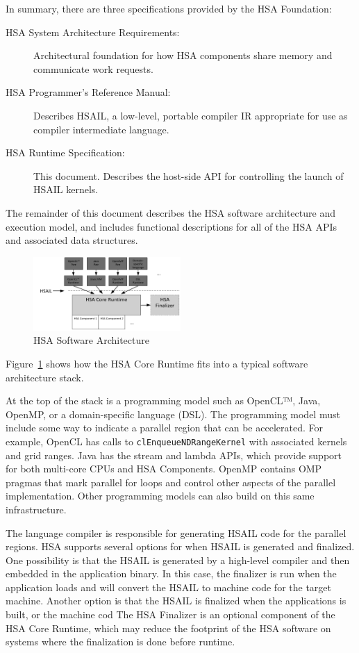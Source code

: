 \documentclass{book}
\begin{document}
In summary, there are three specifications provided by the HSA
Foundation:
\begin{description}
\item[HSA System Architecture Requirements:] Architectural foundation for
how HSA components share memory and communicate work requests.
\item[HSA Programmer’s Reference Manual:] Describes HSAIL, a low-level,
portable compiler IR appropriate for use as compiler intermediate
language.
\item[HSA Runtime Specification:] This document.  Describes the host-side
API for controlling the launch of HSAIL kernels.
\end{description}

The remainder of this document describes the HSA software
architecture and execution model, and includes functional
descriptions for all of the HSA APIs and associated data structures.

\begin{figure}
  \centering
  \includegraphics[width=0.5\textwidth]{fig/swarch}
  \centering
  \caption{HSA Software Architecture}
  \label{fig:swarch}
\end{figure}

Figure~\ref{fig:swarch} shows how the HSA Core Runtime fits into a
typical software architecture stack.

At the top of the stack is a programming model such as OpenCL™,
Java, OpenMP, or a domain-specific language (DSL).   The programming
model must include some way to indicate a parallel region that can
be accelerated.  For example, OpenCL has calls to
\texttt{clEnqueueNDRangeKernel} with associated kernels and grid ranges.
Java has the stream and lambda APIs, which provide support for both
multi-core CPUs and HSA Components.  OpenMP contains OMP pragmas
that mark parallel for loops and control other aspects of the
parallel implementation.  Other programming models can also build on
this same infrastructure.

The language compiler is responsible for generating HSAIL code for
the parallel regions.  HSA supports several options for when HSAIL
is generated and finalized.  One possibility is that the HSAIL is
generated by a high-level compiler and then embedded in the
application binary.  In this case, the finalizer is run when the
application loads and will convert the HSAIL to machine code for the
target machine.   Another option is that the HSAIL is finalized when
the applications is built, or the machine cod  The HSA Finalizer is
an optional component of the HSA Core Runtime, which may reduce the
footprint of the HSA software on systems where the finalization is
done before runtime.
\end{document}
